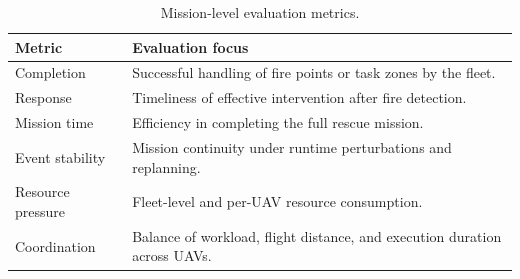 \begin{table}[htbp]
    \centering
    \caption{Mission-level evaluation metrics.}
    \label{tab:evaluation-metrics}
    \small
    \setlength{\tabcolsep}{5pt}
    \renewcommand{\arraystretch}{1.15}
    \begin{tabularx}{\textwidth}{
        @{}
        >{\raggedright\arraybackslash}p{3.0cm}
        >{\raggedright\arraybackslash}X
        @{}
    }
        \toprule
        \textbf{Metric} &
        \textbf{Evaluation focus} \\
        \midrule
        Completion &
        Successful handling of fire points or task zones by the fleet. \\

        Response &
        Timeliness of effective intervention after fire detection. \\

        Mission time &
        Efficiency in completing the full rescue mission. \\

        Event stability &
        Mission continuity under runtime perturbations and replanning. \\

        Resource pressure &
        Fleet-level and per-UAV resource consumption. \\

        Coordination &
        Balance of workload, flight distance, and execution duration across UAVs. \\
        \bottomrule
    \end{tabularx}
\end{table}
